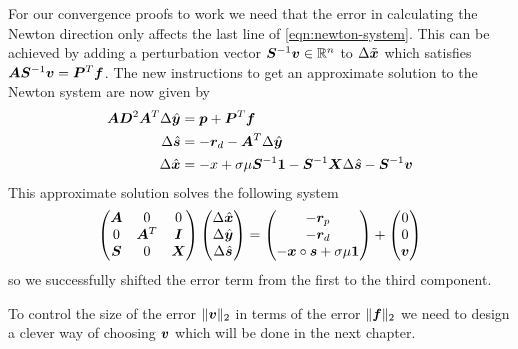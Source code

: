 For our convergence proofs to work we need that the error in calculating the Newton direction only affects the last line of \cref{eqn:newton-system}.
This can be achieved by adding a perturbation vector \(\bm{S}^{-1}\bm{v} \in \mathbb{R}^n\) to \(\Delta\tilde{\bm{x}}\) which satisfies \(\bm{A}\bm{S}^{-1}\bm{v} = \bm{P}^T \bm{f}\). %
The new instructions to get an approximate solution to the Newton system are now given by
\begin{subequations}
  \begin{align}
    \bm{A} \bm{D}^2 \bm{A}^T \Delta\hat{\bm{y}} &= \bm{p} + \bm{P}^{T} \bm{f} \\
    \Delta\hat{\bm{s}} &= -\bm{r}_d - \bm{A}^T \Delta\hat{\bm{y}} \\
    \Delta\hat{\bm{x}} &= -x + \sigma \mu \bm{S}^{-1} \bm{1} - \bm{S}^{-1} \bm{X} \Delta\hat{\bm{s}} - \bm{S}^{-1} \bm{v}
  \end{align}
\end{subequations}
This approximate solution solves the following system
\begin{equation}
  \begin{pmatrix}
    \bm{A} & 0         & 0       \\
    0       & \bm{A}^T & \bm{I} \\
    \bm{S} & 0         & \bm{X} \\
  \end{pmatrix}
  \begin{pmatrix} \Delta\hat{\bm{x}} \\ \Delta\hat{\bm{y}} \\ \Delta\hat{\bm{s}} \end{pmatrix}
  =
  \begin{pmatrix} -\bm{r}_p \\ -\bm{r}_d \\ -\bm{x} \circ \bm{s} + \sigma \mu \bm{1} \end{pmatrix}
  +
  \begin{pmatrix} 0 \\ 0 \\ \bm{v} \end{pmatrix}
\end{equation}
so we successfully shifted the error term from the first to the third component.

To control the size of the error \(\lVert \bm{v} \rVert_2\) in terms of the error \(\lVert \bm{f} \rVert_2\) we need to design a clever way of choosing \(\bm{v}\) which will be done in the next chapter.